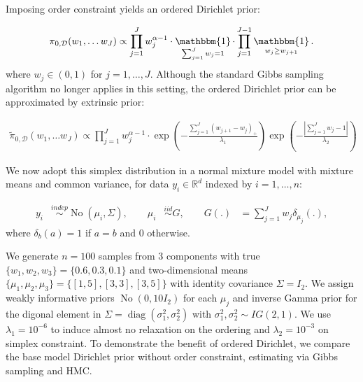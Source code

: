 \documentclass[10pt]{article}
\newcommand{\bb}[1]{\mathbb{#1}}
\newcommand{\mc}[1]{\mathcal{#1}}
\DeclareMathOperator{\No}{No}
\DeclareMathOperator{\diag}{diag}
\DeclareMathOperator{\1}{\mathbbm{1}}
\begin{document}
Imposing order constraint yields an ordered Dirichlet prior:

 \begin{equation}
\begin{aligned}
\label{ordered_dp_prior}
\pi_{0, \mc D}(w_1,\ldots w_J) \propto \prod_{j=1}^J w_j^{\alpha-1} \cdot \1_{\sum_{j=1}^J w_j=1} \cdot  \prod_{j=1}^{J-1}\1_{w_j \ge w_{j+1}}.
\end{aligned}
\end{equation}
where $w_j\in (0,1)$ for $j=1,\ldots,J$. Although the standard Gibbs sampling algorithm \citep{ishwaran2001gibbs} no longer applies in this setting, the ordered Dirichlet prior can be approximated by extrinsic prior:

 \begin{equation*}
\begin{aligned}
\tilde\pi_{0, \mc D}(w_1,\ldots w_J)  \propto \prod_{j=1}^J w_j^{\alpha-1} \cdot  \exp ( -  \frac{ \sum_{j=1}^J ( w_{j+1} - w_j )_+}{\lambda_1})
 \exp ( -  \frac{|{\sum_{j=1}^J w_j - 1}|}{\lambda_2})
\end{aligned}
\end{equation*}

We now adopt this simplex distribution in a normal mixture model with mixture means and common variance, for data $y_i\in \bb R^d$ indexed by $i=1,\ldots,n$:

\begin{equation*}
\begin{aligned}
y_i &\stackrel{indep}{\sim} \No(\mu_i,\Sigma),\qquad
\mu_i &\stackrel{iid}{\sim} G,\qquad
G(.) & = \sum_{j=1}^{J} w_j \delta_{\mu_j}(.),
\end{aligned}
\end{equation*}
where $\delta_{b}(a)=1$ if $a=b$ and $0$ otherwise.

We generate $n=100$ samples from $3$ components with true $\{w_1,w_2,w_3\}=\{0.6,0.3,0.1\}$ and two-dimensional means $\{\mu_1,\mu_2,\mu_3\} = \{[1,5], [3,3], [3,5]\}$ with identity covariance $\Sigma = I_2$. We assign weakly informative priors $\No(0,10 I_2)$ for each $\mu_j$ and inverse Gamma prior for the digonal element in $\Sigma=\diag(\sigma_1^2,\sigma_2^2)$ with $\sigma^2_1, \sigma^2_2\sim IG(2,1)$. We use $\lambda_1 = 10^{-6}$ to induce almost no relaxation on the ordering and $\lambda_2 = 10^{-3}$ on simplex constraint. To demonstrate the benefit of ordered Dirichlet, we compare the base model Dirichlet prior without order constraint, estimating via Gibbs sampling and HMC. 
\end{document}
